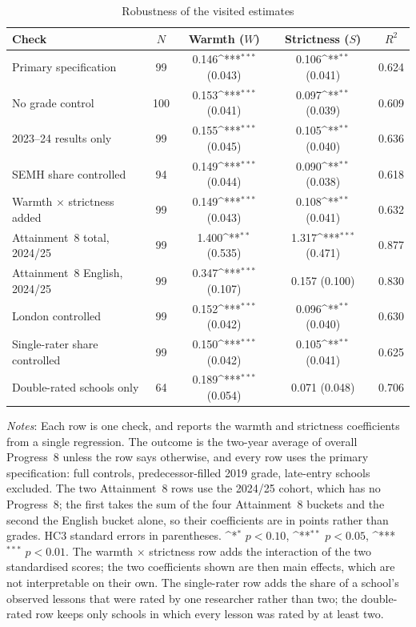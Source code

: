 \begin{table}[htbp]\centering
\caption{Robustness of the visited estimates}
\label{tab:robustness_overall}
\def\sym#1{\ifmmode^{#1}\else\(^{#1}\)\fi}
\small
\begin{tabular}{lcccc}
\toprule
Check                             &  $N$ &             Warmth ($W$) &         Strictness ($S$) & $R^2$ \\
\midrule
Primary specification             &   99 &   0.146\sym{***} (0.043) &    0.106\sym{**} (0.041) & 0.624 \\
\addlinespace
No grade control                  &  100 &   0.153\sym{***} (0.041) &    0.097\sym{**} (0.039) & 0.609 \\
2023--24 results only             &   99 &   0.155\sym{***} (0.045) &    0.105\sym{**} (0.040) & 0.636 \\
SEMH share controlled             &   94 &   0.149\sym{***} (0.044) &    0.090\sym{**} (0.038) & 0.618 \\
Warmth $\times$ strictness added  &   99 &   0.149\sym{***} (0.043) &    0.108\sym{**} (0.041) & 0.632 \\
Attainment~8 total, 2024/25       &   99 &    1.400\sym{**} (0.535) &   1.317\sym{***} (0.471) & 0.877 \\
Attainment~8 English, 2024/25     &   99 &   0.347\sym{***} (0.107) &            0.157 (0.100) & 0.830 \\
London controlled                 &   99 &   0.152\sym{***} (0.042) &    0.096\sym{**} (0.040) & 0.630 \\
Single-rater share controlled     &   99 &   0.150\sym{***} (0.042) &    0.105\sym{**} (0.041) & 0.625 \\
Double-rated schools only         &   64 &   0.189\sym{***} (0.054) &            0.071 (0.048) & 0.706 \\
\bottomrule
\end{tabular}
\begin{minipage}{\linewidth}\vspace{4pt}\scriptsize
\textit{Notes}: Each row is one check, and reports the warmth and strictness coefficients from a single regression. The outcome is the two-year average of overall Progress~8 unless the row says otherwise, and every row uses the primary specification: full controls, predecessor-filled 2019 grade, late-entry schools excluded. The two Attainment~8 rows use the 2024/25 cohort, which has no Progress~8; the first takes the sum of the four Attainment~8 buckets and the second the English bucket alone, so their coefficients are in points rather than grades. HC3 standard errors in parentheses. \sym{*} \(p<0.10\), \sym{**} \(p<0.05\), \sym{***} \(p<0.01\). The warmth $\times$ strictness row adds the interaction of the two standardised scores; the two coefficients shown are then main effects, which are not interpretable on their own. The single-rater row adds the share of a school's observed lessons that were rated by one researcher rather than two; the double-rated row keeps only schools in which every lesson was rated by at least two.
\end{minipage}
\end{table}
